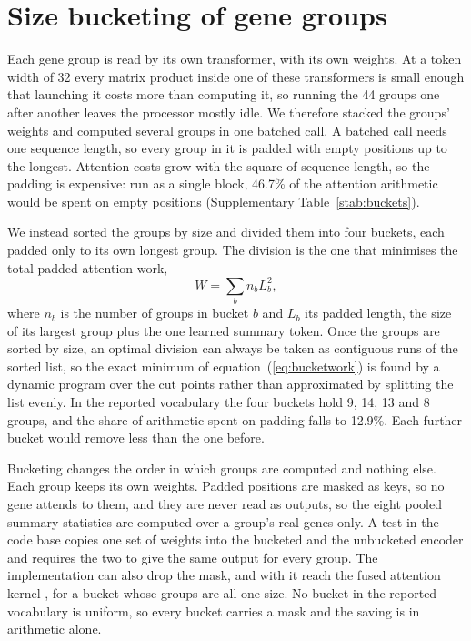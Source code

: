 
\section{Size bucketing of gene groups}
\label{note:buckets}

Each gene group is read by its own transformer, with its own weights. At a
token width of 32 every matrix product inside one of these transformers is
small enough that launching it costs more than computing it, so running the
44 groups one after another leaves the processor mostly idle. We therefore
stacked the groups' weights and computed several groups in one batched
call. A batched call needs one sequence length, so every group in it is
padded with empty positions up to the longest. Attention costs grow with
the square of sequence length, so the padding is expensive: run as a single
block, 46.7\% of the attention arithmetic would be spent on empty positions
(Supplementary Table~\ref{stab:buckets}).

We instead sorted the groups by size and divided them into four buckets,
each padded only to its own longest group. The division is the one that
minimises the total padded attention work,
\begin{equation}
W = \sum_{b} n_b L_b^{2},
\label{eq:bucketwork}
\end{equation}
where $n_b$ is the number of groups in bucket $b$ and $L_b$ its padded
length, the size of its largest group plus the one learned summary token.
Once the groups are sorted by size, an optimal division can always be taken
as contiguous runs of the sorted list, so the exact minimum of
equation~(\ref{eq:bucketwork}) is found by a dynamic program over the cut
points rather than approximated by splitting the list evenly. In the
reported vocabulary the four buckets hold 9, 14, 13 and 8 groups, and the
share of arithmetic spent on padding falls to 12.9\%. Each further bucket
would remove less than the one before.

Bucketing changes the order in which groups are computed and nothing else.
Each group keeps its own weights. Padded positions are masked as keys, so
no gene attends to them, and they are never read as outputs, so the eight
pooled summary statistics are computed over a group's real genes only. A
test in the code base copies one set of weights into the bucketed and the
unbucketed encoder and requires the two to give the same output for every
group. The implementation can also drop the mask, and with it reach the
fused attention kernel \citep{dao2022flashattention}, for a bucket whose groups are all one size. No
bucket in the reported vocabulary is uniform, so every bucket carries a
mask and the saving is in arithmetic alone.

